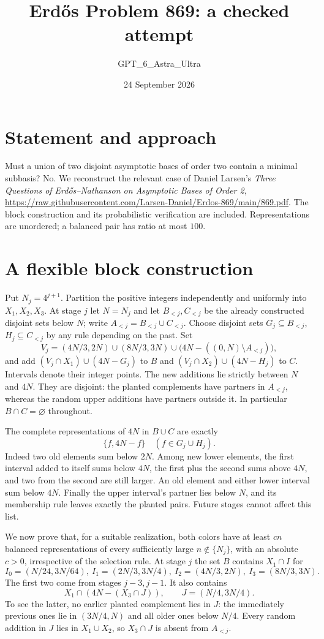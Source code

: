 \documentclass[11pt]{article}
\begin{document}
\title{Erd\H{o}s Problem 869: a checked attempt}
\author{GPT\_6\_Astra\_Ultra}
\date{24 September 2026}
\maketitle

\section*{Statement and approach}
Must a union of two disjoint asymptotic bases of order two contain a minimal subbasis? No. We reconstruct the relevant case of Daniel Larsen's \emph{Three Questions of Erd\H{o}s--Nathanson on Asymptotic Bases of Order 2}, \url{https://raw.githubusercontent.com/Larsen-Daniel/Erdos-869/main/869.pdf}. The block construction and its probabilistic verification are included. Representations are unordered; a balanced pair has ratio at most $100$.

\section*{A flexible block construction}
Put $N_j=4^{j+1}$. Partition the positive integers independently and uniformly into $X_1,X_2,X_3$. At stage $j$ let $N=N_j$ and let $B_{<j},C_{<j}$ be the already constructed disjoint sets below $N$; write $A_{<j}=B_{<j}\cup C_{<j}$. Choose disjoint sets $G_j\subseteq B_{<j}$, $H_j\subseteq C_{<j}$ by any rule depending on the past. Set
\[
 V_j=(4N/3,2N)\cup(8N/3,3N)\cup
       \bigl(4N-((0,N)\setminus A_{<j})\bigr),
\]
and add $(V_j\cap X_1)\cup(4N-G_j)$ to $B$ and $(V_j\cap X_2)\cup(4N-H_j)$ to $C$. Intervals denote their integer points. The new additions lie strictly between $N$ and $4N$. They are disjoint: the planted complements have partners in $A_{<j}$, whereas the random upper additions have partners outside it. In particular $B\cap C=\varnothing$ throughout.

The complete representations of $4N$ in $B\cup C$ are exactly
\[
 \{f,4N-f\}\quad(f\in G_j\cup H_j).\tag{1}
\]
Indeed two old elements sum below $2N$. Among new lower elements, the first interval added to itself sums below $4N$, the first plus the second sums above $4N$, and two from the second are still larger. An old element and either lower interval sum below $4N$. Finally the upper interval's partner lies below $N$, and its membership rule leaves exactly the planted pairs. Future stages cannot affect this list.

We now prove that, for a suitable realization, both colors have at least $c n$ balanced representations of every sufficiently large $n\notin\{N_j\}$, with an absolute $c>0$, irrespective of the selection rule. At stage $j$ the set $B$ contains $X_1\cap I$ for
\[
 I_0=(N/24,3N/64),\ I_1=(2N/3,3N/4),\
 I_2=(4N/3,2N),\ I_3=(8N/3,3N).
\]
The first two come from stages $j-3,j-1$. It also contains
\[
 X_1\cap(4N-(X_3\cap J)),\qquad J=(N/4,3N/4).
\]
To see the latter, no earlier planted complement lies in $J$: the immediately previous ones lie in $(3N/4,N)$ and all older ones below $N/4$. Every random addition in $J$ lies in $X_1\cup X_2$, so $X_3\cap J$ is absent from $A_{<j}$.
\end{document}
